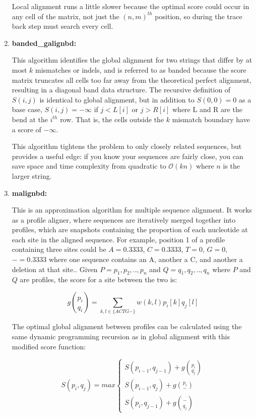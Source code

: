 \documentclass[11pt]{article}
\begin{document}
\begin{enumerate}
Local alignment runs a little slower because the optimal score could
occur in any cell of the matrix, not just the $(n,m)^{th}$ position,
so during the trace back step must search every cell.


\item{\bf{banded\_galignbd}:}

This algorithm identifies the global alignment for two strings that differ
by at most $k$ mismatches or indels, and is referred to as banded because
the score matrix truncates all cells too far away from the theoretical
perfect alignment, resulting in a diagonal band data structure. The
recursive definition of $S(i,j)$ is identical to global alignment, but in
addition to $S(0,0)=0$ as a base case, $S(i,j)=-\infty$ if $j<L[i]$ or
$j>R[i]$ where L and R are the bend at the $i^{th}$ row. That is, the cells
outside the $k$ mismatch boundary have a score of $-\infty$.

This algorithm tightens the problem to only closely related sequences, but
provides a useful edge: if you know your sequences are fairly close, you can
save space and time complexity from quadratic to $\mathcal{O}(kn)$ where $n$
is the larger string.

\item{\bf{malignbd}:}

This is an approximation algorithm for multiple sequence alignment. It works
as a profile aligner, where sequences are iteratively merged together into
profiles, which are snapshots containing the proportion of each nucleotide
at each site in the aligned sequence. For example, position 1 of a profile
containing three sites could be $A=0.3333$, $C=0.3333$, $T=0$, $G=0$,
$-=0.3333$ where one sequence contains an A, another a C, and another a
deletion at that site.. Given $P=p_1,p_2,..,p_n$ and $Q=q_1,q_2,..,q_n$ 
where $P$ and $Q$ are profiles, the score for a site between the two is:

\begin{displaymath}
g{p_i\choose q_i} = \sum\limits_{k,l\in\{ACTG-\}}w(k,l) p_i[k] q_j[l]
\end{displaymath}

The optimal global alignment between profiles can be calculated using the
same dynamic programming recursion as in global alignment with this modified
score function:

\begin{displaymath}
S(p_i,q_j) = max\left\{
  \begin{array}{lr}
    S(p_{i-1},q_{j-1}) + g{p_i\choose q_j}\\
    S(p_{i-1},q_j) + g{p_i\choose -} \\
    S(p_i,q_{j-1}) + g{-\choose q_j}
    \end{array}
    \right.
\end{displaymath}


\end{enumerate}
\end{document}
